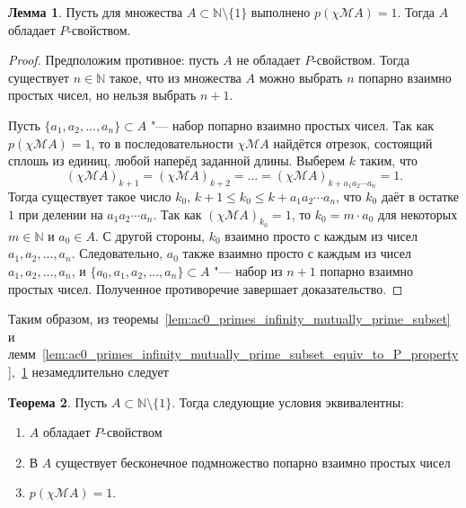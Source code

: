 \documentclass[a4paper,openbib]{article}
\renewcommand{\leq}{\leqslant}
\theoremstyle{definition}
\newtheorem{lemma}{Лемма}[section]
\newtheorem{theorem}[lemma]{Теорема}
\begin{document}

\begin{lemma}
	\label{lem:ac0_primes_q_psi_A_0_causes_P}
	Пусть для множества $A\subset\mathbb{N}\setminus\{1\}$ выполнено $p(\chi\mathscr{M}A)=1$.
	Тогда $A$ обладает $P$-свойством.
\end{lemma}

\begin{proof}
	Предположим противное: пусть $A$ не обладает $P$-свойством.
	Тогда существует $n\in\mathbb{N}$ такое, что из множества $A$ можно выбрать $n$
	попарно взаимно простых чисел, но нельзя выбрать $n+1$.

	Пусть $\{a_1, a_2, ..., a_n\}\subset A$ "--- набор попарно взаимно простых чисел.
	Так как $p(\chi\mathscr{M}A)=1$, то в последовательности $\chi\mathscr{M}A$ найдётся отрезок, состоящий сплошь из единиц,
	любой наперёд заданной длины.
	Выберем $k$ таким, что
	\begin{equation}
		(\chi\mathscr{M}A)_{k+1} = (\chi\mathscr{M}A)_{k+2} = ... = (\chi\mathscr{M}A)_{k+a_1a_2\cdots a_n} = 1
		.
	\end{equation}
	Тогда существует такое число $k_0$, $k+1 \leq k_0 \leq k+a_1a_2\cdots a_n$,
	что $k_0$ даёт в остатке $1$ при делении на $a_1a_2\cdots a_n$.
	Так как $(\chi\mathscr{M}A)_{k_0} = 1$, то $k_0 = m\cdot a_0$ для некоторых $m\in\mathbb{N}$ и $a_0\in A$.
	С другой стороны, $k_0$ взаимно просто с каждым из чисел $a_1, a_2, ..., a_n$.
	Следовательно, $a_0$ также взаимно просто с каждым из чисел $a_1, a_2, ..., a_n$,
	и $\{a_0, a_1, a_2, ..., a_n\}\subset A$ "--- набор из $n+1$ попарно взаимно простых чисел.
	Полученное противоречие завершает доказательство.
\end{proof}

Таким образом,
из теоремы~\ref{lem:ac0_primes_infinity_mutually_prime_subset}
и лемм~\ref{lem:ac0_primes_infinity_mutually_prime_subset_equiv_to_P_property},~\ref{lem:ac0_primes_q_psi_A_0_causes_P}
незамедлительно следует
\begin{theorem}
	Пусть $A\subset \mathbb{N}\setminus\{1\}$.
	Тогда следующие условия эквивалентны:
	\begin{enumerate}[label=(\roman*)]
		\item
			$A$ обладает $P$-свойством
		\item
			В $A$ существует бесконечное подмножество попарно взаимно простых чисел
		\item
			$p(\chi\mathscr{M}A)=1$.
	\end{enumerate}
\end{theorem}
\end{document}
